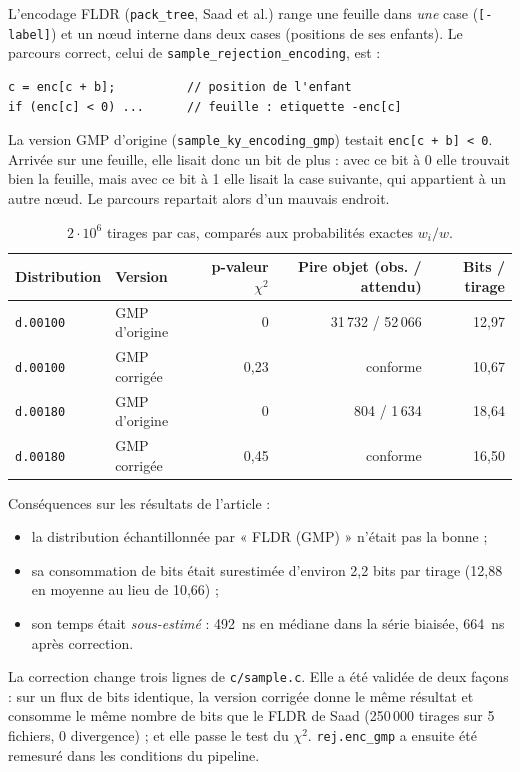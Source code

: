 \documentclass[11pt,a4paper]{article}
\newcommand{\code}[1]{\texttt{#1}}
\begin{document}
L'encodage FLDR (\code{pack\_tree}, Saad et al.) range une feuille dans \emph{une} case
(\code{[-label]}) et un nœud interne dans deux cases (positions de ses enfants). Le
parcours correct, celui de \code{sample\_rejection\_encoding}, est :
\begin{lstlisting}
c = enc[c + b];          // position de l'enfant
if (enc[c] < 0) ...      // feuille : etiquette -enc[c]
\end{lstlisting}
La version GMP d'origine (\code{sample\_ky\_encoding\_gmp}) testait \code{enc[c + b] < 0}.
Arrivée sur une feuille, elle lisait donc un bit de plus : avec ce bit à 0 elle trouvait
bien la feuille, mais avec ce bit à 1 elle lisait la case suivante, qui appartient à un
autre nœud. Le parcours repartait alors d'un mauvais endroit.

\begin{table}[H]
\centering
\small
\begin{tabular}{llrrr}
\toprule
Distribution & Version & p-valeur $\chi^2$ & Pire objet (obs. / attendu) & Bits / tirage \\
\midrule
\code{d.00100} & GMP d'origine & 0 & 31\,732 / 52\,066 & 12,97 \\
\code{d.00100} & GMP corrigée  & 0,23 & conforme & 10,67 \\
\code{d.00180} & GMP d'origine & 0 & 804 / 1\,634 & 18,64 \\
\code{d.00180} & GMP corrigée  & 0,45 & conforme & 16,50 \\
\bottomrule
\end{tabular}
\caption{$2\cdot 10^6$ tirages par cas, comparés aux probabilités exactes $w_i/w$.}
\end{table}

\noindent Conséquences sur les résultats de l'article :
\begin{itemize}
\item la distribution échantillonnée par « FLDR (GMP) » n'était pas la bonne ;
\item sa consommation de bits était surestimée d'environ 2,2 bits par tirage
  (12,88 en moyenne au lieu de 10,66) ;
\item son temps était \emph{sous-estimé} : 492~ns en médiane dans la série biaisée,
  664~ns après correction.
\end{itemize}

La correction change trois lignes de \code{c/sample.c}.
Elle a été validée de deux façons : sur un flux de bits identique, la version corrigée
donne le même résultat et consomme le même nombre de bits que le FLDR de Saad
(250\,000 tirages sur 5 fichiers, 0 divergence) ; et elle passe le test du $\chi^2$.
\code{rej.enc\_gmp} a ensuite été remesuré dans les conditions du pipeline.
\end{document}
